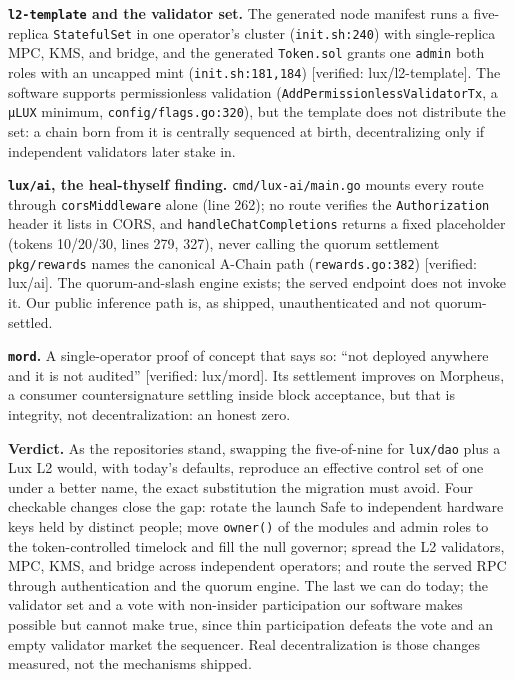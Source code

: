 \documentclass[11pt,a4paper]{article}
\newcommand{\code}[1]{\texttt{\small #1}}
\newcommand{\pv}[1]{{\color{muted}\sffamily\scriptsize[#1]}}
\begin{document}
\noindent\textbf{\code{l2-template} and the validator set.} The generated node
manifest runs a five-replica \code{StatefulSet} in one operator's cluster
(\code{init.sh:240}) with single-replica MPC, KMS, and bridge, and the generated
\code{Token.sol} grants one \code{admin} both roles with an uncapped mint
(\code{init.sh:181,184}) \pv{verified: lux/l2-template}. The software supports
permissionless validation (\code{AddPermissionlessValidatorTx}, a \code{µLUX}
minimum, \code{config/flags.go:320}), but the template does not distribute the set:
a chain born from it is centrally sequenced at birth, decentralizing only if
independent validators later stake in.

\noindent\textbf{\code{lux/ai}, the heal-thyself finding.} \code{cmd/lux-ai/main.go}
mounts every route through \code{corsMiddleware} alone (line 262); no route verifies
the \code{Authorization} header it lists in CORS, and \code{handleChatCompletions}
returns a fixed placeholder (tokens 10/20/30, lines 279, 327), never calling the
quorum settlement \code{pkg/rewards} names the canonical A-Chain path
(\code{rewards.go:382}) \pv{verified: lux/ai}. The quorum-and-slash engine exists;
the served endpoint does not invoke it. Our public inference path is, as shipped,
unauthenticated and not quorum-settled.

\noindent\textbf{\code{mord}.} A single-operator proof of concept that says so:
``not deployed anywhere and it is not audited'' \pv{verified: lux/mord}. Its
settlement improves on Morpheus, a consumer countersignature settling inside block
acceptance, but that is integrity, not decentralization: an honest zero.

\vspace{0.3ex}
\noindent\textbf{Verdict.} As the repositories stand, swapping the five-of-nine for
\code{lux/dao} plus a Lux L2 would, with today's defaults, reproduce an effective
control set of one under a better name, the exact substitution the migration must
avoid. Four checkable changes close the gap: rotate the launch Safe to independent
hardware keys held by distinct people; move \code{owner()} of the modules and admin
roles to the token-controlled timelock and fill the null governor; spread the L2
validators, MPC, KMS, and bridge across independent operators; and route the served
RPC through authentication and the quorum engine. The last we can do today; the
validator set and a vote with non-insider participation our software makes possible
but cannot make true, since thin participation defeats the vote and an empty
validator market the sequencer. Real decentralization is those changes measured, not
the mechanisms shipped.

\vspace{0.5ex}
\end{document}
